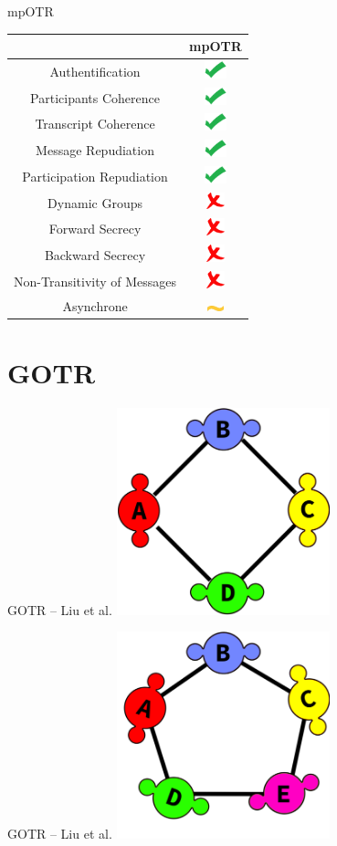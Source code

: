 \documentclass{beamer}
\newcommand{\okay}{\includegraphics[height=0.5cm]{img/check.png}}
\newcommand{\nope}{\includegraphics[height=0.5cm]{img/cross.png}}
\newcommand{\sortof}{\includegraphics[width=0.5cm]{img/tilde.png}}
\begin{document}
\begin{frame}{mpOTR}
	\center
  	\begin{tabular}{c|c}
			 & mpOTR \\
			\hline
  		Authentification & \okay \\
  		\hline
  		Participants Coherence & \okay \\
  		Transcript Coherence & \okay \\
  		\hline
  		Message Repudiation & \okay \\
  		Participation Repudiation & \okay \\
  		\hline
  		Dynamic Groups & \nope \\
  		\hline
  		Forward Secrecy & \nope \\
  		Backward Secrecy & \nope \\
  		Non-Transitivity of Messages & \nope \\
  		\hline
  		Asynchrone & \sortof 
    \end{tabular}
\end{frame}


\section{GOTR}
\begin{frame}{GOTR – Liu et al.\cite{gotr}}
	\center
	\includegraphics[height=6cm]{img/group_ring4.png}
\end{frame}

\begin{frame}{GOTR – Liu et al.\cite{gotr}}
	\center
	\includegraphics[height=6cm]{img/group_ring5.png}
\end{frame}
\end{document}
